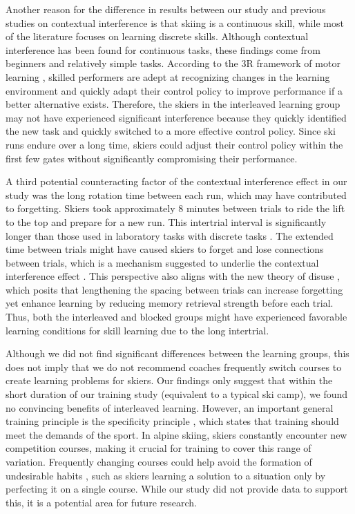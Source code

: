 Another reason for the difference in results between our study and previous studies on contextual interference is that skiing is a continuous skill, while most of the literature focuses on learning discrete skills\cite{lee_distribution_1988, lee_distribution_1989}. Although contextual interference has been found for continuous tasks\cite{pauwels_contextual_2014, tsutsui_contextual_1998}, these findings come from beginners and relatively simple tasks. According to the 3R framework of motor learning \cite{tsay_strategy_2023}, skilled performers are adept at recognizing changes in the learning environment and quickly adapt their control policy to improve performance if a better alternative exists. Therefore, the skiers in the interleaved learning group may not have experienced significant interference because they quickly identified the new task and quickly switched to a more effective control policy. Since ski runs endure over a long time, skiers could adjust their control policy within the first few gates without significantly compromising their performance.

A third potential counteracting factor of the contextual interference effect in our study was the long rotation time between each run, which may have contributed to forgetting. Skiers took approximately 8 minutes between trials to ride the lift to the top and prepare for a new run. This intertrial interval is significantly longer than those used in laboratory tasks with discrete tasks \cite{barreiros_contextual_2007}. The extended time between trials might have caused skiers to forget and lose connections between trials, which is a mechanism suggested to underlie the contextual interference effect \cite{lee_locus_1983, lee_can_1985}. This perspective also aligns with the new theory of disuse \cite{bjork_new_1992}, which posits that lengthening the spacing between trials can increase forgetting yet enhance learning by reducing memory retrieval strength before each trial. Thus, both the interleaved and blocked groups might have experienced favorable learning conditions for skill learning due to the long intertrial.

Although we did not find significant differences between the learning groups, this does not imply that we do not recommend coaches frequently switch courses to create learning problems for skiers. Our findings only suggest that within the short duration of our training study (equivalent to a typical ski camp), we found no convincing benefits of interleaved learning. However, an important general training principle is the specificity principle \cite{lee_chapter_1988}, which states that training should meet the demands of the sport. In alpine skiing, skiers constantly encounter new competition courses, making it crucial for training to cover this range of variation. Frequently changing courses could help avoid the formation of undesirable habits \cite{du_relationship_2022}, such as skiers learning a solution to a situation only by perfecting it on a single course. While our study did not provide data to support this, it is a potential area for future research.

